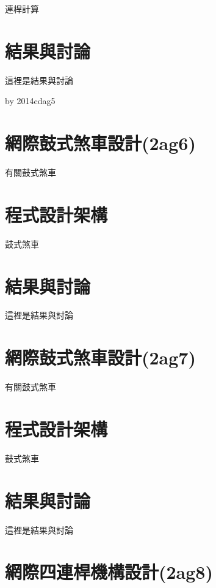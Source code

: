 \documentclass[]{article}
\begin{document}
連桿計算

\section{結果與討論}\label{ux7d50ux679cux8207ux8a0eux8ad6-1}

這裡是結果與討論

by 2014cdag5

\section{網際鼓式煞車設計(2ag6)}\label{ux7db2ux969bux9f13ux5f0fux715eux8ecaux8a2dux8a082ag6}

有關鼓式煞車

\section{程式設計架構}\label{ux7a0bux5f0fux8a2dux8a08ux67b6ux69cb-2}

鼓式煞車

\section{結果與討論}\label{ux7d50ux679cux8207ux8a0eux8ad6-2}

這裡是結果與討論

\section{網際鼓式煞車設計(2ag7)}\label{ux7db2ux969bux9f13ux5f0fux715eux8ecaux8a2dux8a082ag7}

有關鼓式煞車

\section{程式設計架構}\label{ux7a0bux5f0fux8a2dux8a08ux67b6ux69cb-3}

鼓式煞車

\section{結果與討論}\label{ux7d50ux679cux8207ux8a0eux8ad6-3}

這裡是結果與討論

\section{網際四連桿機構設計(2ag8)}\label{ux7db2ux969bux56dbux9023ux687fux6a5fux69cbux8a2dux8a082ag8}
\end{document}

